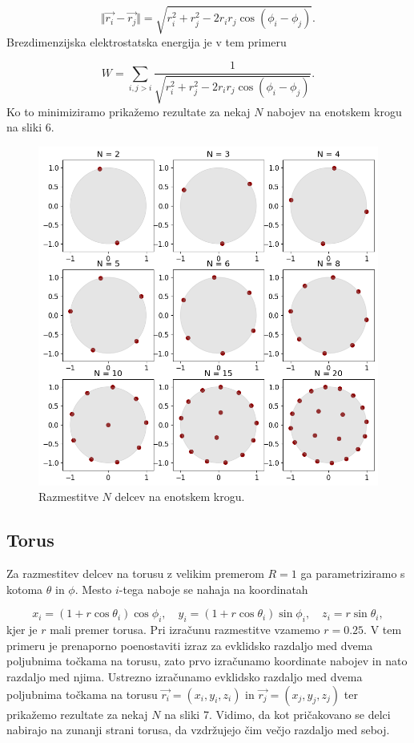 \documentclass[slovene,11pt,a4paper]{article}
\begin{document}
\begin{equation}
\Vert\vec{r_i}-\vec{r_j}\Vert = \sqrt{r_i^2 + r_j^2 - 2r_ir_j \cos(\phi_i-\phi_j)}.
\end{equation}
Brezdimenzijska elektrostatska energija je v tem primeru

\begin{equation}
W = \sum_{i, j>i} \frac{1}{\sqrt{r_i^2 + r_j^2 - 2r_ir_j \cos(\phi_i-\phi_j)}}.
\end{equation}
Ko to minimiziramo prikažemo rezultate za nekaj $N$ nabojev na enotskem krogu na sliki 6.

\newpage

\begin{figure}[h!]
\centering
\includegraphics[width=12.5cm]{krog.png}
\caption{Razmestitve $N$ delcev na enotskem krogu.}
\end{figure}

\subsection{Torus}

Za razmestitev delcev na torusu z velikim premerom $R=1$ ga parametriziramo s kotoma $\theta$ in $\phi$. Mesto $i$-tega naboje se nahaja na koordinatah 

\[
x_i = (1+r\cos\theta_i)\cos\phi_i, \quad y_i = (1+r\cos\theta_i)\sin\phi_i, \quad z_i = r\sin\theta_i,
\]
kjer je $r$ mali premer torusa. Pri izračunu razmestitve vzamemo $r=0.25$. V tem primeru je prenaporno poenostaviti izraz za evklidsko razdaljo med dvema poljubnima točkama na torusu, zato prvo izračunamo koordinate nabojev in nato razdaljo med njima. Ustrezno izračunamo evklidsko razdaljo med dvema poljubnima točkama na torusu $\vec{r_i} = (x_i, y_i, z_i)$ in $\vec{r_j} = (x_j, y_j, z_j)$ ter prikažemo rezultate za nekaj $N$ na sliki 7. Vidimo, da kot pričakovano se delci nabirajo na zunanji strani torusa, da vzdržujejo čim večjo razdaljo med seboj.
\end{document}
